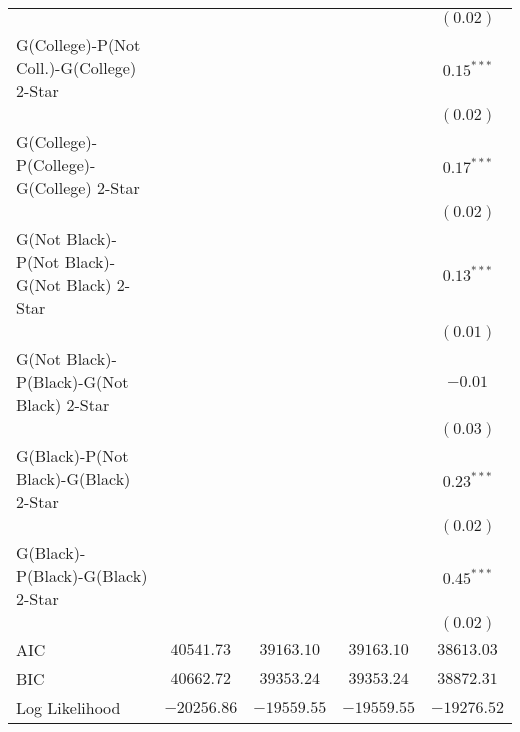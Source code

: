 \begin{center}
\begin{longtable}{l c c c c}
                                              &               &               &               & $(0.02)$      \\
G(College)-P(Not Coll.)-G(College) 2-Star     &               &               &               & $0.15^{***}$  \\
                                              &               &               &               & $(0.02)$      \\
G(College)-P(College)-G(College) 2-Star       &               &               &               & $0.17^{***}$  \\
                                              &               &               &               & $(0.02)$      \\
G(Not Black)-P(Not Black)-G(Not Black) 2-Star &               &               &               & $0.13^{***}$  \\
                                              &               &               &               & $(0.01)$      \\
G(Not Black)-P(Black)-G(Not Black) 2-Star     &               &               &               & $-0.01$       \\
                                              &               &               &               & $(0.03)$      \\
G(Black)-P(Not Black)-G(Black) 2-Star         &               &               &               & $0.23^{***}$  \\
                                              &               &               &               & $(0.02)$      \\
G(Black)-P(Black)-G(Black) 2-Star             &               &               &               & $0.45^{***}$  \\
                                              &               &               &               & $(0.02)$      \\
\midrule
AIC                                           & $40541.73$    & $39163.10$    & $39163.10$    & $38613.03$    \\
BIC                                           & $40662.72$    & $39353.24$    & $39353.24$    & $38872.31$    \\
Log Likelihood                                & $-20256.86$   & $-19559.55$   & $-19559.55$   & $-19276.52$   \\
\end{longtable}
\end{center}
